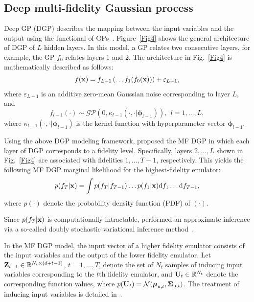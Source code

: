 \documentclass[iicol,sn-basic]{sn-jnl}%
\theoremstyle{thmstyleone}%
\theoremstyle{thmstyletwo}
\theoremstyle{thmstylethree}
\begin{document}
\begin{linenumbers}
\subsection{Deep multi-fidelity Gaussian process}\label{Sec54}

Deep GP (DGP) describes the mapping between the input variables and the output using the functional of GPs~\citep{Damianou2013}.
Figure~\ref{Fig4} shows the general architecture of DGP of $L$ hidden layers.
In this model, a GP relates two consecutive layers, for example, the GP $f_0$ relates layers 1 and 2.
The architecture in Fig.~\ref{Fig4} is mathematically described as follows:
\begin{equation}\label{Eq24}
	f({\bf x}) = f_{L-1}\left(\dots f_1(f_0({\bf x}))\right)+\varepsilon_{L-1},
\end{equation}
where $\varepsilon_{L-1}$ is an additive zero-mean Gaussian noise corresponding to layer $L$, and
\begin{equation}\label{Eq25}
	f_{l-1}(\cdot) \sim \mathcal{GP}\left(0,\kappa_{l-1}(\cdot,\cdot|{\boldsymbol \phi}_{l-1})\right), \ \ l=1,\dots,L,
\end{equation}
where $\kappa_{l-1}(\cdot,\cdot|{\boldsymbol \phi}_{l-1})$ is the kernel function with hyperparameter vector ${\boldsymbol \phi}_{l-1}$.

Using the above DGP modeling framework, \cite{Cutajar2019} proposed the MF DGP in which each layer of DGP corresponds to a fidelity level.
Specifically, layers $2,\dots,L$ shown in Fig.~\ref{Fig4} are associated with fidelities $1,\dots,T-1$, respectively.
This yields the following MF DGP marginal likelihood for the highest-fidelity emulator:
\begin{equation}\label{Eq26}
	p(f_{T}|{\bf x}) = \int p(f_{T}|f_{T-1})\dots p(f_{1}|{\bf x}) \text{d}f_{1} \dots \text{d}f_{T-1},
\end{equation}
where $p(\cdot)$ denote the probability density function (PDF) of $(\cdot)$.

Since $p(f_{T}|{\bf x})$ is computationally intractable, \cite{Cutajar2019} performed an approximate inference via a so-called doubly stochastic variational inference method~\citep{Salimbeni2017}.

In the MF DGP model, the input vector of a higher fidelity emulator consists of the input variables and the output of the lower fidelity emulator.
Let ${\bf Z}_{t-1} \in \mathbb{R}^{N_t \times {(d+t-1)}}$, $t=1,\dots,T$, denote the set of $N_t$ samples of inducing input variables corresponding to the $t$th fidelity emulator, and ${\bf U}_{t} \in \mathbb{R}^{N_t}$ denote the corresponding function values, where $p({\bf U}_{t}) = \mathcal{N}({\boldsymbol \mu}_{\text{u},t},{\boldsymbol \Sigma}_{\text{u},t})$.
The treatment of inducing input variables is detailed in~\cite{Cutajar2019}.
 

\end{linenumbers}
\end{document}
